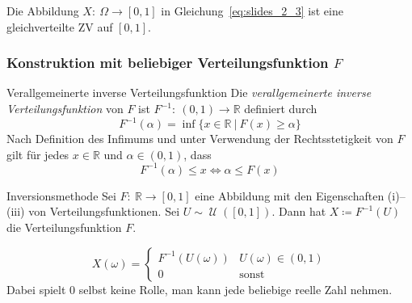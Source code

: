 \documentclass[a4paper,10pt]{article}
\def\R{\mathbb{R}}
\renewcommand{\P}{\operatorname{\mathbb{P}}}
\DeclareMathOperator{\uniform}{\mathcal{U}}
\numberwithin{equation}{section}
\begin{document}
\begin{subbox}{}
    Die Abbildung \( X: \: \Omega \to [0, 1] \) in Gleichung~\eqref{eq:slides_2_3} ist eine gleichverteilte ZV auf \( [0, 1] \).
\end{subbox}

\subsubsection{Konstruktion mit beliebiger Ver\-tei\-lungs\-funk\-tion \( F \)}



\begin{mainbox}{Verallgemeinerte inverse Verteilungsfunktion}
    Die \emph{verallgemeinerte inverse Verteilungsfunktion} von \( F \) ist \( F^{-1}: \: (0, 1) \to \R \) definiert durch
    \[
        F^{-1}(\alpha) = \inf\{x \in \R \: | \: F(x) \geq \alpha\}
    \]
    Nach Definition des Infimums und unter Verwendung der Rechtsstetigkeit von \( F \) gilt für jedes \( x \in \R \) und \( \alpha \in (0, 1) \), dass
    \[
        F^{-1}(\alpha) \leq x \iff \alpha \leq F(x)
    \]
\end{mainbox}


\begin{mainbox}{Inversionsmethode}
    Sei \( F: \: \R \to [0, 1] \) eine Abbildung mit den Eigenschaften (i)–(iii) von Verteilungsfunktionen. Sei \( U \sim \uniform([0, 1]) \). Dann hat \( X \coloneqq F^{-1}(U) \) die Verteilungsfunktion \( F \).
\end{mainbox}

\[
    X(\omega) = \begin{cases}
        F^{-1}(U(\omega)) & U(\omega) \in (0, 1) \\
        0 & \text{sonst}
    \end{cases}
\]
Dabei spielt \( 0 \) selbst keine Rolle, man kann jede beliebige reelle Zahl nehmen.
\end{document}
